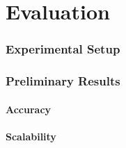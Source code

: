 \chapter{Evaluation}
\label{ch:evaluation}
\newpage

\subsection{Experimental Setup}

\subsection{Preliminary Results}

\subsubsection{Accuracy}

\subsubsection{Scalability}








